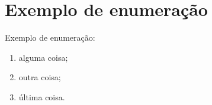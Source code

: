 \section{Exemplo de enumeração}

Exemplo de enumeração:

\begin{enumerate}
	\item alguma coisa;
	\item outra coisa;
	\item última coisa.
\end{enumerate}
